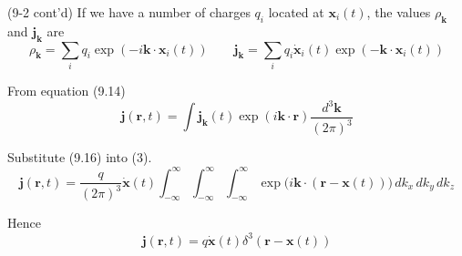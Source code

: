 \documentclass[12pt]{article}
\begin{document}
(9-2 cont'd)
If we have a number of charges $q_i$ located at $\mathbf x_i(t)$,
the values $\rho_{\mathbf k}$ and $\mathbf j_{\mathbf k}$ are
\begin{equation*}
\rho_{\mathbf k}=\sum_iq_i\exp(-i\mathbf k\cdot\mathbf x_i(t))
\qquad
\mathbf j_{\mathbf k}
=\sum_iq_i\dot{\mathbf x}_i(t)
\exp(-\mathbf k\cdot\mathbf x_i(t))
\tag{9.16}
\end{equation*}

From equation (9.14)
\begin{equation*}
\mathbf j(\mathbf r,t)
=\int\mathbf j_{\mathbf k}(t)
\exp(i\mathbf k\cdot\mathbf r)
\frac{d^3\mathbf k}{(2\pi)^3}
\tag{3}
\end{equation*}

Substitute (9.16) into (3).
\begin{equation*}
\mathbf j(\mathbf r,t)
=\frac{q}{(2\pi)^3}\dot{\mathbf x}(t)
\int_{-\infty}^\infty
\int_{-\infty}^\infty
\int_{-\infty}^\infty
\exp\big(i\mathbf k\cdot(\mathbf r-\mathbf x(t))\big)
\,dk_x\,dk_y\,dk_z
\end{equation*}

Hence
\begin{equation*}
\mathbf j(\mathbf r,t)=q\dot{\mathbf x}(t)\delta^3(\mathbf r-\mathbf x(t))
\end{equation*}
\end{document}
